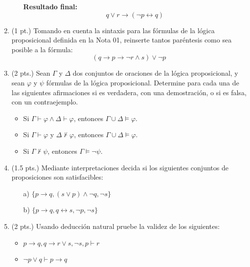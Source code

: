 \documentclass[11pt,letterpaper]{article}
\begin{document}
\begin{enumerate}
\begin{itemize}
      \textbf{Resultado final:}
      \[
      q \lor r \rightarrow (\neg p \leftrightarrow q)
      \]
    \end{itemize}
    
    \bigskip

  \item (1 pt.) Tomando en cuenta la sintaxis para las fórmulas de la lógica proposicional definida en la Nota 01, reinserte tantos paréntesis como sea posible a la fórmula:
    \[
    (q \rightarrow p \rightarrow \neg r \land s) \lor \neg p
    \]

  \bigskip

  \item (2 pts.) Sean $\Gamma$ y $\Delta$ dos conjuntos de oraciones de la lógica proposicional, y sean $\varphi$ y $\psi$ fórmulas de la lógica proposicional. Determine para cada una de las siguientes afirmaciones si es verdadera, con una demostración, o si es falsa, con un contraejemplo.

    \begin{itemize}
       \item Si $\Gamma \vdash \varphi \land \Delta \vdash \varphi$, entonces $\Gamma \cup \Delta \models \varphi$.
       \item Si $\Gamma \vdash \varphi$ y $\Delta \not\vdash \varphi$, entonces $\Gamma \cup \Delta \models \varphi$.
       \item Si $\Gamma \not\vdash \psi$, entonces $\Gamma \models \neg \psi$.
    \end{itemize}

  \bigskip

  \item (1.5 pts.) Mediante interpretaciones decida si los siguientes conjuntos de proposiciones son satisfacibles:

    \begin{itemize}
       \item[a)] $\{ p \rightarrow q, (s \lor p) \land \neg q, \neg s \}$
       \item[b)] $\{ p \rightarrow q, q \leftrightarrow s, \neg p, \neg s \}$
    \end{itemize}

  \bigskip

  \item (2 pts.) Usando deducción natural pruebe la validez de los siguientes:

    \begin{itemize}
       \item $p \rightarrow q, q \rightarrow r \lor s, \neg s, p \vdash r$
       \item $\neg p \lor q \vdash p \rightarrow q$
    \end{itemize}


\end{enumerate}
\end{document}
